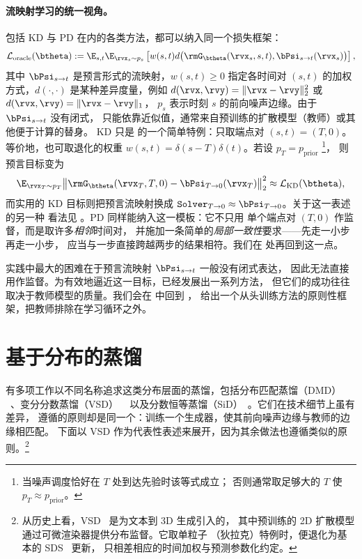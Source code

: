 \paragraph{流映射学习的统一视角。}
包括 KD 与 PD 在内的各类方法，都可以纳入同一个损失框架：
\begin{align}\label{eq:general-cm-loss}
  \mathcal{L}_{\mathrm{oracle}}(\btheta)
  := \E_{s,t} \E_{\rvx_s \sim p_s}
  \left[  w(s,t)  d \big(\rmG_\btheta(\rvx_s, s,t),  \bPsi_{s\to t}(\rvx_s)\big)\right],
\end{align}
其中 $\bPsi_{s\to t}$ 是预言形式的流映射，$w(s,t) \geq 0$ 指定各时间对 $(s,t)$ 的加权方式，$d(\cdot,\cdot)$ 是某种差异度量，例如
$d(\rvx,\rvy)=\|\rvx-\rvy\|_2^2$ 或 $d(\rvx,\rvy)=\|\rvx-\rvy\|_1$，
$p_s$ 表示时刻 $s$ 的前向噪声边缘。由于 $\bPsi_{s\to t}$ 没有闭式，
只能依靠近似值，通常来自预训练的扩散模型（教师）或其他便于计算的替身。
KD 只是  的一个简单特例：只取端点对
$(s,t)=(T,0)$。等价地，也可取退化的权重
$w(s,t)=\delta(s{-}T)\delta(t)$。若设 $p_T=p_{\mathrm{prior}}$
\footnote{当噪声调度恰好在 $T$ 处到达先验时该等式成立；
否则通常取足够大的 $T$ 使 $p_T\approx p_{\mathrm{prior}}$。}，
则预言目标变为
\[
\E_{\rvx_T\sim p_T}
\big\|\rmG_\btheta(\rvx_T,T,0)-\bPsi_{T\to 0}(\rvx_T)\big\|_2^2
\approx \mathcal{L}_{\mathrm{KD}}(\btheta),
\]
而实用的 KD 目标则把预言流映射换成
$\mathtt{Solver}_{T\to 0}\approx\bPsi_{T\to 0}$。关于这一表述的另一种
看法见 。PD 同样能纳入这一模板：它不只用
单个端点对 $(T,0)$ 作监督，而是取许多\emph{相邻}时间对，
并施加一条简单的\emph{局部一致性}要求——先走一小步再走一小步，
应当与一步直接跨越两步的结果相符。我们在 
处再回到这一点。

实践中最大的困难在于预言流映射 $\bPsi_{s\to t}$ 一般没有闭式表达，
因此无法直接用作监督。为有效地逼近这一目标，已经发展出一系列方法，
但它们的成功往往取决于教师模型的质量。我们会在
 中回到 ，
给出一个从头训练方法的原则性框架，把教师排除在学习循环之外。


\section{\texorpdfstring{基于分布的蒸馏}{基于分布的蒸馏}}\label{sec:VSD}


有多项工作以不同名称追求这类分布层面的蒸馏，包括分布匹配蒸馏（DMD）
~\citep{yin2024one,yin2024improved}、变分分数蒸馏（VSD）
~\citep{pooledreamfusion,wang2023prolificdreamer,luo2023diff,lu2024simplifying}
以及分数恒等蒸馏（SiD）~\citep{zhou2024score}。它们在技术细节上虽有差异，
遵循的原则却是同一个：训练一个生成器，使其前向噪声边缘与教师的边缘相匹配。
下面以 VSD 作为代表性表述来展开，因为其余做法也遵循类似的原则。\footnote{
从历史上看，VSD~\citep{wang2023prolificdreamer} 是为文本到 3D 生成引入的，
其中预训练的 2D 扩散模型通过可微渲染器提供分布监督。它取单粒子
（狄拉克）特例时，便退化为基本的 SDS~\citep{pooledreamfusion} 更新，
只相差相应的时间加权与预测参数化约定。
}


